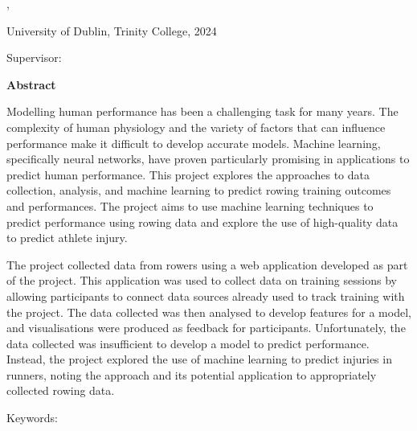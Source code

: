 \thispagestyle{plain}
\begin{center}
  \vspace{3cm}
  \textbf{\Huge\thesistitle}

  \begin{minipage}{12cm}
    \begin{center}
      \thesissubtitle
    \end{center}
  \end{minipage}

  \vspace{1cm}

  \authorname, \degree

  University of Dublin, Trinity College, 2024

  Supervisor: \supervisor

  \vspace{2cm}
  \textbf{Abstract}
\end{center}


Modelling human performance has been a challenging task for many years. The complexity of human physiology and the variety of factors that can influence performance make it difficult to develop accurate models. Machine learning, specifically neural networks, have proven particularly promising in applications to predict human performance. This project explores the approaches to data collection, analysis, and machine learning to predict rowing training outcomes and performances. The project aims to use machine learning techniques to predict performance using rowing data and explore the use of high-quality data to predict athlete injury. 

The project collected data from rowers using a web application developed as part of the project. This application was used to collect data on training sessions by allowing participants to connect data sources already used to track training with the project. The data collected was then analysed to develop features for a model, and visualisations were produced as feedback for participants. Unfortunately, the data collected was insufficient to develop a model to predict performance. Instead, the project explored the use of machine learning to predict injuries in runners, noting the approach and its potential application to appropriately collected rowing data.

Keywords: \keywords